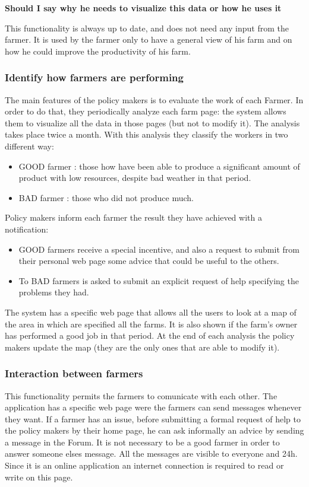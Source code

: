 \documentclass{article}
\begin{document}
\textbf{Should I say why he needs to visualize this data or how he uses it}


This functionality is always up to date, and does not need 
any input from the farmer.
It is used by the farmer only to have a general view of 
his farm and on how he could improve the productivity of his farm.



\subsubsection{Identify how farmers are performing}
The main features of the policy makers is to evaluate the work of each Farmer. 
In order to do that, they periodically analyze each farm page: 
the system allows them to visualize all the data in those pages 
(but not to modify it).
The analysis takes place twice a month.
With this analysis they classify the workers in two different way:
\begin{itemize}
    \item GOOD farmer : those how have been able to produce a significant amount of product with low resources, despite bad weather in that period.
    \item BAD farmer : those who did not produce much.
\end{itemize}
Policy makers inform each farmer the result they have achieved with a notification: 
\begin{itemize}
    \item GOOD farmers receive a special 
    incentive, and also a request to submit 
    from their personal web page some advice that could be useful to the others. 
    \item To BAD farmers is asked to submit an explicit request of help specifying the problems they had.
\end{itemize}
The system has a specific web page that allows all 
the users to look at a map of the area in which are 
specified all the farms. It is also shown if the farm's owner has performed 
a good job in that period.
At the end of each analysis the policy makers 
update the map (they are the only ones that are able to modify it).



\subsubsection{Interaction between farmers}
This functionality permits the farmers to comunicate with each other. 
The application has a specific web page were the farmers can send messages 
whenever they want.
If a farmer has an issue, before submitting a formal request of help to 
the policy makers 
by their home page, he can ask informally an advice by sending a message 
in the Forum.
It is not necessary to be a good farmer in order to answer someone elses 
message. All the messages are visible to everyone and 24h. 
Since it is an online application an internet connection is required to read or write 
on this page.
\end{document}
